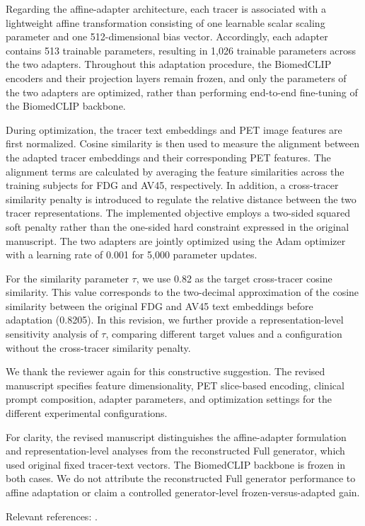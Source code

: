 {Regarding the affine-adapter architecture, each tracer is associated with a lightweight affine transformation consisting of one learnable scalar scaling parameter and one 512-dimensional bias vector. Accordingly, each adapter contains 513 trainable parameters, resulting in 1,026 trainable parameters across the two adapters. Throughout this adaptation procedure, the BiomedCLIP encoders and their projection layers remain frozen, and only the parameters of the two adapters are optimized, rather than performing end-to-end fine-tuning of the BiomedCLIP backbone.

During optimization, the tracer text embeddings and PET image features are first normalized. Cosine similarity is then used to measure the alignment between the adapted tracer embeddings and their corresponding PET features. The alignment terms are calculated by averaging the feature similarities across the training subjects for FDG and AV45, respectively. In addition, a cross-tracer similarity penalty is introduced to regulate the relative distance between the two tracer representations. The implemented objective employs a two-sided squared soft penalty rather than the one-sided hard constraint expressed in the original manuscript. The two adapters are jointly optimized using the Adam optimizer with a learning rate of 0.001 for 5,000 parameter updates.

For the similarity parameter \ensuremath{\tau}, we use 0.82 as the target cross-tracer cosine similarity. This value corresponds to the two-decimal approximation of the cosine similarity between the original FDG and AV45 text embeddings before adaptation (0.8205). In this revision, we further provide a representation-level sensitivity analysis of \ensuremath{\tau}, comparing different target values and a configuration without the cross-tracer similarity penalty.

We thank the reviewer again for this constructive suggestion. The revised manuscript specifies feature dimensionality, PET slice-based encoding, clinical prompt composition, adapter parameters, and optimization settings for the different experimental configurations.

For clarity, the revised manuscript distinguishes the affine-adapter formulation and representation-level analyses from the reconstructed Full generator, which used original fixed tracer-text vectors. The BiomedCLIP backbone is frozen in both cases. We do not attribute the reconstructed Full generator performance to affine adaptation or claim a controlled generator-level frozen-versus-adapted gain.

Relevant references: \cite{zhang2025multimodal}.}


